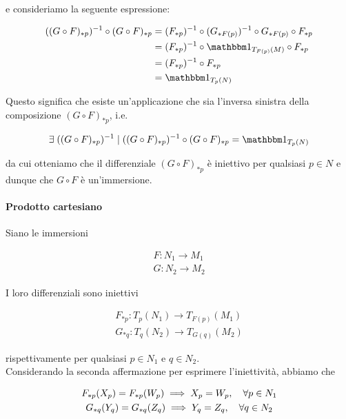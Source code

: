 {e consideriamo la seguente espressione:

\begin{align}
	\begin{split}
		((G \circ F)_{*p})^{-1} \circ (G \circ F)_{*p} &= (F_{*p})^{-1} \circ (G_{*F(p)})^{-1} \circ G_{*F(p)} \circ F_{*p} \\
		&= (F_{*p})^{-1} \circ \bigone_{T_{F(p)}(M)} \circ F_{*p} \\
		&= (F_{*p})^{-1} \circ F_{*p} \\
		&= \bigone_{T_{p}(N)}
	\end{split}
\end{align}

Questo significa che esiste un'applicazione che sia l'inversa sinistra della composizione $ (G \circ F)_{*p} $, i.e.

\begin{equation}
	\E ((G \circ F)_{*p})^{-1} \mid ((G \circ F)_{*p})^{-1} \circ (G \circ F)_{*p} = \bigone_{T_{p}(N)}
\end{equation}

da cui otteniamo che il differenziale $ (G \circ F)_{*p} $ è iniettivo per qualsiasi $ p \in N $ e dunque che $ G \circ F $ è un'immersione.

\paragraph{Prodotto cartesiano}

Siano le immersioni

\begin{gather}
	F : N_{1} \to M_{1} \\
	G : N_{2} \to M_{2}
\end{gather}

I loro differenziali sono iniettivi

\begin{gather}
	F_{*p} : T_{p}(N_{1}) \to T_{F(p)}(M_{1}) \\
	G_{*q} : T_{q}(N_{2}) \to T_{G(q)}(M_{2})
\end{gather}

rispettivamente per qualsiasi $ p \in N_{1} $ e $ q \in N_{2} $. \\
Considerando la seconda affermazione per esprimere l'iniettività, abbiamo che

\begin{gather}
	F_{*p}(X_{p}) = F_{*p}(W_{p}) \implies X_{p} = W_{p} \qcomma \forall p \in N_{1} \\
	G_{*q}(Y_{q}) = G_{*q}(Z_{q}) \implies Y_{q} = Z_{q} \qcomma \forall q \in N_{2}
\end{gather}

}
